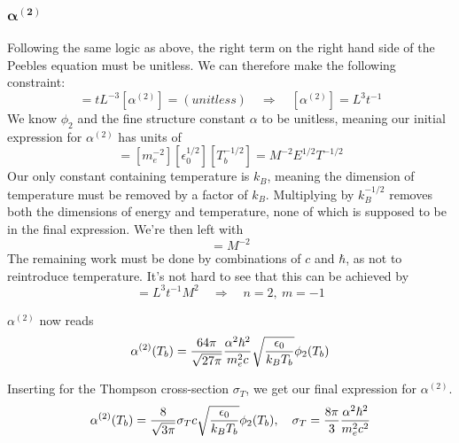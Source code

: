\documentclass[10pt, a4paper]{article}
\begin{document}
\subsubsection{\texorpdfstring{$\mathbf{\alpha^{(2)}}$}{TEXT} }
Following the same logic as above, the right term on the right hand side of the Peebles equation must be unitless. We can therefore make the following constraint:
\begin{equation*}
    [H^{-1}][n_H][\alpha^{(2)}] = tL^{-3}[\alpha^{(2)}] = (unitless) \quad\Rightarrow\quad [\alpha^{(2)}] = L^3t^{-1}
\end{equation*}
We know $\phi_2$ and the fine structure constant $\alpha$ to be unitless, meaning our initial expression for $\alpha^{(2)}$ has units of
\begin{equation*}
    [\alpha^{(2)}] = [m_e^{-2}][\epsilon_0^{1/2}][T_b^{-1/2}] = M^{-2}E^{1/2}T^{-1/2}
\end{equation*}
Our only constant containing temperature is $k_B$, meaning the dimension of temperature must be removed by a factor of $k_B$. Multiplying by $k_B^{-1/2}$ removes both the dimensions of energy and temperature, none of which is supposed to be in the final expression. We're then left with
\begin{equation*}
    [\alpha^{(2)}][k_B^{1/2}] = M^{-2}
\end{equation*}
The remaining work must be done by combinations of $c$ and $\hbar$, as not to reintroduce temperature. It's not hard to see that this can be achieved by
\begin{equation*}
    [\hbar^n][c^m] = L^3t^{-1}M^2  \quad\Rightarrow\quad n=2,\ m=-1
\end{equation*}

$\alpha^{(2)}$ now reads
\begin{equation*}
    \alpha^{(2)}\qty(T_{b}) = \frac{64 \pi}{\sqrt{27 \pi}} \frac{\alpha^{2} \hbar^2}{m_{e}^{2} c} \sqrt{\frac{\epsilon_{0}}{k_B T_{b}}} \phi_{2}\qty(T_{b})
\end{equation*}

Inserting for the Thompson cross-section $\sigma_T$, we get our final expression for $\alpha^{(2)}$.
\begin{equation*}
    \alpha^{(2)}\qty(T_{b}) = \frac{8}{\sqrt{3 \pi}} \sigma_T c \sqrt{\frac{\epsilon_{0}}{k_B T_{b}}} \phi_{2}\qty(T_{b}), \quad \sigma_{T}=\frac{8 \pi}{3} \frac{\alpha^{2} \hbar^{2}}{m_{e}^{2} c^{2}}
\end{equation*}
\end{document}
